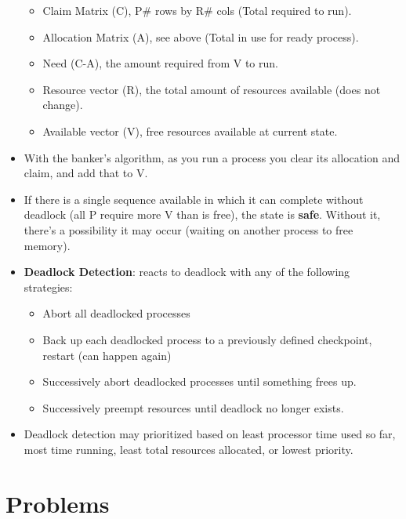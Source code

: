 \documentclass[fontsize=5pt]{scrartcl}
\begin{document}
\begin{multicols}{3}
\begin{itemize}
\begin{itemize}
             \item Claim Matrix (C), P\# rows by R\# cols (Total required to run).
             \item Allocation Matrix (A), see above (Total in use for ready process).
             \item Need (C-A), the amount required from V to run.
             \item Resource vector (R), the total amount of resources available (does not change).
             \item Available vector (V), free resources available at current state.
           \end{itemize}
            \item With the banker's algorithm, as you run a process you clear its allocation and claim, and add that to V.
            \item If there is a single sequence available in which it can complete without deadlock (all P require more V than is free),
                  the state is \textbf{safe}. Without it, there's a possibility it may occur (waiting on another process to free memory).
            \item \textbf{Deadlock Detection}: reacts to deadlock with any of the following strategies:
            \begin{itemize}
              \item Abort all deadlocked processes
              \item Back up each deadlocked process to a previously defined checkpoint, restart (can happen again)
              \item Successively abort deadlocked processes until something frees up.
              \item Successively preempt resources until deadlock no longer exists.
            \end{itemize}
            \item Deadlock detection may prioritized based on least processor time used so far, most time running, least total resources allocated, or lowest
                  priority.
            \end{itemize}
            
            
  \section{Problems}

\end{multicols}
\end{document}
